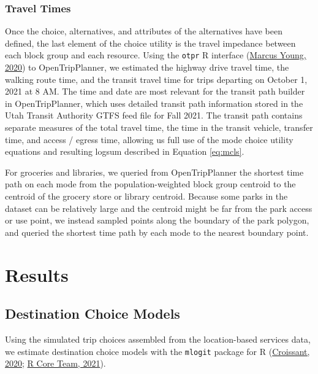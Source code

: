 \documentclass[3p, authoryear, review]{elsarticle} %
\begin{document}
\hypertarget{travel-times}{%
\subsubsection{Travel Times}\label{travel-times}}

Once the choice, alternatives, and attributes of the alternatives have been
defined, the last element of the choice utility is the travel impedance between
each block group and each resource. Using the \texttt{otpr} R interface (\protect\hyperlink{ref-otpr}{Marcus Young, 2020}) to
OpenTripPlanner, we estimated the highway drive travel time, the walking
route time, and the transit travel time for trips departing on October 1,
2021 at 8 AM. The time and date are most relevant for the transit path builder
in OpenTripPlanner, which uses detailed transit path information stored in the
Utah Transit Authority GTFS feed file for Fall 2021. The transit path contains
separate measures of the total travel time, the time in the transit vehicle,
transfer time, and access / egress time, allowing us full use of the
mode choice utility equations and resulting logsum described in Equation \eqref{eq:mcls}.

For groceries and libraries, we queried from OpenTripPlanner the shortest time path on each
mode from the population-weighted block group centroid to the centroid of the grocery
store or library centroid. Because some parks in the dataset can be relatively
large and the centroid might be far from the park access or use point, we instead
sampled points along the boundary of the park polygon, and queried the shortest
time path by each mode to the nearest boundary point.

\hypertarget{results}{%
\section{Results}\label{results}}

\hypertarget{destination-choice-models}{%
\subsection{Destination Choice Models}\label{destination-choice-models}}

Using the simulated trip choices assembled from the location-based services data,
we estimate destination choice models with the \texttt{mlogit} package for
R (\protect\hyperlink{ref-mlogit}{Croissant, 2020}; \protect\hyperlink{ref-R}{R Core Team, 2021}).
\end{document}
